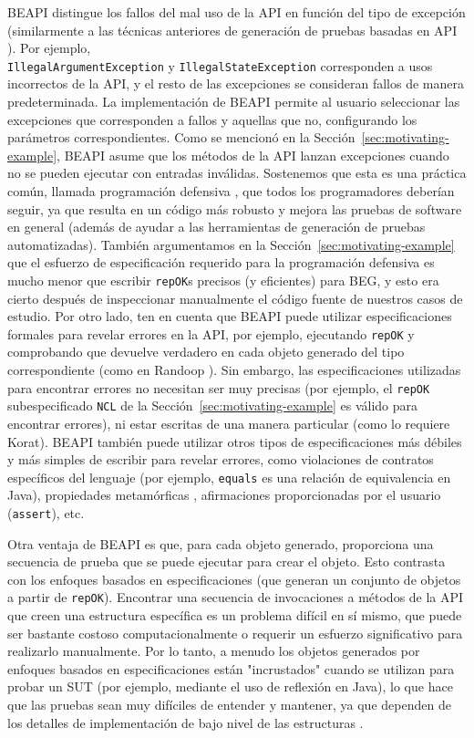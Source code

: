 \textsf{BEAPI} distingue los fallos del mal uso de la API en función del tipo de excepción (similarmente a las técnicas anteriores de generación de pruebas basadas en API \cite{Pacheco07}). Por ejemplo,\\
\texttt{IllegalArgumentException} y \texttt{IllegalStateException} corresponden a usos incorrectos de la API, y el resto de las excepciones se consideran fallos de manera predeterminada. La implementación de \textsf{BEAPI} permite al usuario seleccionar las excepciones que corresponden a fallos y aquellas que no, configurando los parámetros correspondientes. Como se mencionó en la Sección~\ref{sec:motivating-example}, \textsf{BEAPI} asume que los métodos de la API lanzan excepciones cuando no se pueden ejecutar con entradas inválidas. Sostenemos que esta es una práctica común, llamada programación defensiva \cite{Liskov00}, que todos los programadores deberían seguir, ya que resulta en un código más robusto y mejora las pruebas de software en general \cite{Ammann16} (además de ayudar a las herramientas de generación de pruebas automatizadas). También argumentamos en la Sección~\ref{sec:motivating-example} que el esfuerzo de especificación requerido para la programación defensiva es mucho menor que escribir \texttt{repOK}s precisos (y eficientes) para BEG, y esto era cierto después de inspeccionar manualmente el código fuente de nuestros casos de estudio. Por otro lado, ten en cuenta que \textsf{BEAPI} puede utilizar especificaciones formales para revelar errores en la API, por ejemplo, ejecutando \texttt{repOK} y comprobando que devuelve verdadero en cada objeto generado del tipo correspondiente (como en Randoop \cite{Pacheco07}). Sin embargo, las especificaciones utilizadas para encontrar errores no necesitan ser muy precisas (por ejemplo, el \texttt{repOK} subespecificado \texttt{NCL} de la Sección~\ref{sec:motivating-example} es válido para encontrar errores), ni estar escritas de una manera particular (como lo requiere \textsf{Korat}). \textsf{BEAPI} también puede utilizar otros tipos de especificaciones más débiles y más simples de escribir para revelar errores, como violaciones de contratos específicos del lenguaje (por ejemplo, \texttt{equals} es una relación de equivalencia en Java), propiedades metamórficas \cite{Chen19}, afirmaciones proporcionadas por el usuario (\texttt{assert}), etc.

Otra ventaja de \textsf{BEAPI} es que, para cada objeto generado, proporciona una secuencia de prueba que se puede ejecutar para crear el objeto. Esto contrasta con los enfoques basados en especificaciones (que generan un conjunto de objetos a partir de \texttt{repOK}). Encontrar una secuencia de invocaciones a métodos de la API que creen una estructura específica es un problema difícil en sí mismo, que puede ser bastante costoso computacionalmente \cite{Braione17} o requerir un esfuerzo significativo para realizarlo manualmente. Por lo tanto, a menudo los objetos generados por enfoques basados en especificaciones están "incrustados" cuando se utilizan para probar un SUT (por ejemplo, mediante el uso de reflexión en Java), lo que hace que las pruebas sean muy difíciles de entender y mantener, ya que dependen de los detalles de implementación de bajo nivel de las estructuras \cite{Braione17}.

